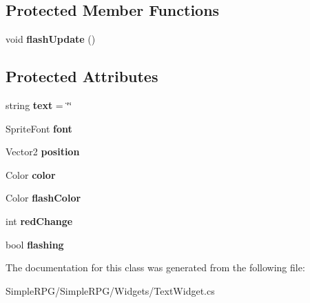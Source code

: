 \subsection*{Protected Member Functions}
\begin{DoxyCompactItemize}
\item 
\hypertarget{class_simple_r_p_g_1_1_widgets_1_1_text_widget_a8d1cf29c11acc868070c897d51f0000c}{void {\bfseries flash\-Update} ()}\label{class_simple_r_p_g_1_1_widgets_1_1_text_widget_a8d1cf29c11acc868070c897d51f0000c}

\end{DoxyCompactItemize}
\subsection*{Protected Attributes}
\begin{DoxyCompactItemize}
\item 
\hypertarget{class_simple_r_p_g_1_1_widgets_1_1_text_widget_a060fc2ff5ce833c130788873116049cb}{string {\bfseries text} = \char`\"{}\char`\"{}}\label{class_simple_r_p_g_1_1_widgets_1_1_text_widget_a060fc2ff5ce833c130788873116049cb}

\item 
\hypertarget{class_simple_r_p_g_1_1_widgets_1_1_text_widget_abf9e9cf9275582afe162d971bfaf2d01}{Sprite\-Font {\bfseries font}}\label{class_simple_r_p_g_1_1_widgets_1_1_text_widget_abf9e9cf9275582afe162d971bfaf2d01}

\item 
\hypertarget{class_simple_r_p_g_1_1_widgets_1_1_text_widget_a37a150b972ba5f086821b5729af3b6f6}{Vector2 {\bfseries position}}\label{class_simple_r_p_g_1_1_widgets_1_1_text_widget_a37a150b972ba5f086821b5729af3b6f6}

\item 
\hypertarget{class_simple_r_p_g_1_1_widgets_1_1_text_widget_a221a6baebf53762f1e1f282a4febbe72}{Color {\bfseries color}}\label{class_simple_r_p_g_1_1_widgets_1_1_text_widget_a221a6baebf53762f1e1f282a4febbe72}

\item 
\hypertarget{class_simple_r_p_g_1_1_widgets_1_1_text_widget_ad8813c5ec28a1d75aaad00efdd895a2c}{Color {\bfseries flash\-Color}}\label{class_simple_r_p_g_1_1_widgets_1_1_text_widget_ad8813c5ec28a1d75aaad00efdd895a2c}

\item 
\hypertarget{class_simple_r_p_g_1_1_widgets_1_1_text_widget_a64872fa01dadc9aca4c02432407d5807}{int {\bfseries red\-Change}}\label{class_simple_r_p_g_1_1_widgets_1_1_text_widget_a64872fa01dadc9aca4c02432407d5807}

\item 
\hypertarget{class_simple_r_p_g_1_1_widgets_1_1_text_widget_a19c259ba6a56c9a7763e46160b8b0a9f}{bool {\bfseries flashing}}\label{class_simple_r_p_g_1_1_widgets_1_1_text_widget_a19c259ba6a56c9a7763e46160b8b0a9f}

\end{DoxyCompactItemize}


The documentation for this class was generated from the following file\-:\begin{DoxyCompactItemize}
\item 
Simple\-R\-P\-G/\-Simple\-R\-P\-G/\-Widgets/Text\-Widget.\-cs\end{DoxyCompactItemize}
